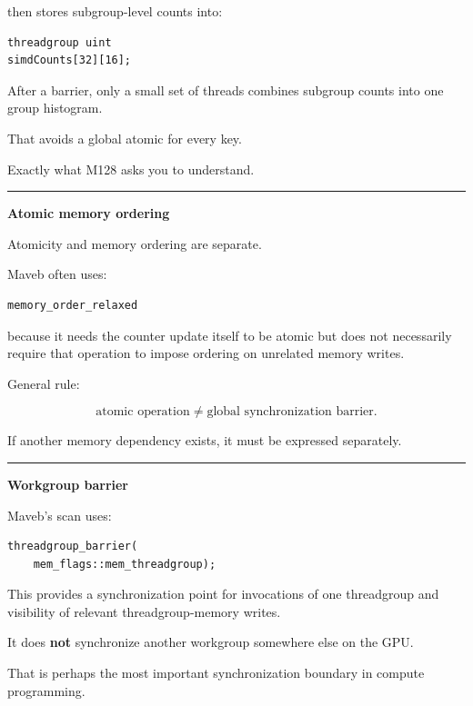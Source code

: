then stores subgroup-level counts into:

\protect{}\label{af4u60}%
\begin{verbatim}
threadgroup uint
simdCounts[32][16];
\end{verbatim}

After a barrier, only a small set of threads combines subgroup counts into one group histogram.

That avoids a global atomic for every key.

Exactly what M128 asks you to understand.

\begin{center}\rule{0.5\linewidth}{0.5pt}\end{center}

\textbf{Atomic memory ordering}

Atomicity and memory ordering are separate.

Maveb often uses:

\protect{}\label{7dyn47}%
\begin{verbatim}
memory_order_relaxed
\end{verbatim}

because it needs the counter update itself to be atomic but does not necessarily require that operation to impose ordering on unrelated memory writes.

General rule:

\[
\boxed{
\text{atomic operation}
\neq
\text{global synchronization barrier}.
}
\]

If another memory dependency exists, it must be expressed separately.

\begin{center}\rule{0.5\linewidth}{0.5pt}\end{center}

\textbf{Workgroup barrier}

Maveb's scan uses:

\protect{}\label{jow2md}%
\begin{verbatim}
threadgroup_barrier(
    mem_flags::mem_threadgroup);
\end{verbatim}

This provides a synchronization point for invocations of one threadgroup and visibility of relevant threadgroup-memory writes.

It does \textbf{not} synchronize another workgroup somewhere else on the GPU.

That is perhaps the most important synchronization boundary in compute programming.

